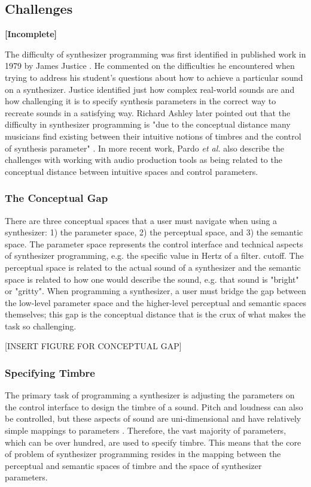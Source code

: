 \subsection{Challenges}
\textbf{[Incomplete]}

The difficulty of synthesizer programming was first identified in published work in 1979 by James Justice \cite{justice1979analytic}. He commented on the difficulties he encountered when trying to address his student's questions about how to achieve a particular sound on a synthesizer. Justice identified just how complex real-world sounds are and how challenging it is to specify synthesis parameters in the correct way to recreate sounds in a satisfying way. Richard Ashley later pointed out that the difficulty in synthesizer programming is "due to the conceptual distance many musicians find existing between their intuitive notions of timbres and the control of synthesis parameter" \cite{ashley1986knowledge}. In more recent work, Pardo \textit{et al.} also describe the challenges with working with audio production tools as being related to the conceptual distance between intuitive spaces and control parameters. 

\subsubsection{The Conceptual Gap}
There are three conceptual spaces that a user must navigate when using a synthesizer: 1) the parameter space, 2) the perceptual space, and 3) the semantic space. The parameter space represents the control interface and technical aspects of synthesizer programming, e.g. the specific value in Hertz of a filter. cutoff. The perceptual space is related to the actual sound of a synthesizer and the semantic space is related to how one would describe the sound, e.g. that sound is "bright" or "gritty". When programming a synthesizer, a user must bridge the gap between the low-level parameter space and the higher-level perceptual and semantic spaces themselves; this gap is the conceptual distance that is the crux of what makes the task so challenging.

[INSERT FIGURE FOR CONCEPTUAL GAP]

\subsubsection{Specifying Timbre}
The primary task of programming a synthesizer is adjusting the parameters on the control interface to design the timbre of a sound. Pitch and loudness can also be controlled, but these aspects of sound are uni-dimensional and have relatively simple mappings to parameters \cite{seago2004critical}. Therefore, the vast majority of parameters, which can be over hundred, are used to specify timbre. This means that the core of problem of synthesizer programming resides in the mapping between the perceptual and semantic spaces of timbre and the space of synthesizer parameters.
 
